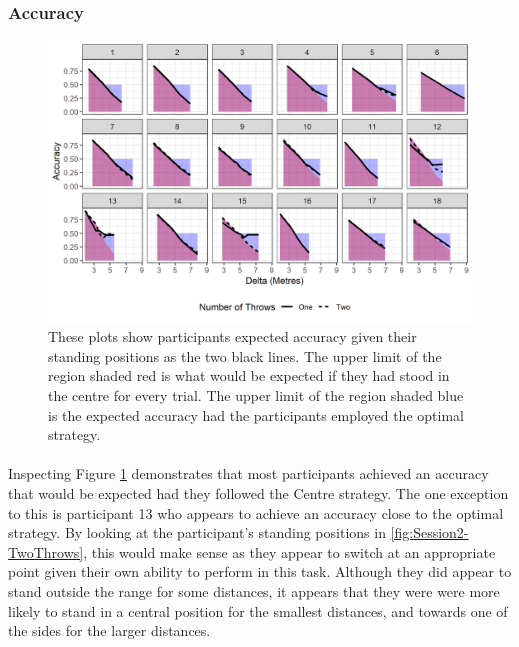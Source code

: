 \documentclass[12pt]{article}
\begin{document}
\subsubsection*{Accuracy}

\begin{figure}[ht!]%
	\includegraphics[scale=0.9]{Figures/Experiment_2_Two_throw/Accuracyshaded_regions}
	\centering
	\captionsetup{justification=centering}
	\caption{These plots show participants expected accuracy given their standing positions as the two black lines. The upper limit of the region shaded red is what would be expected if they had stood in the centre for every trial. The upper limit of the region shaded blue is the expected accuracy had the participants employed the optimal strategy.}
	\label{fig:Session2-TwoThrows-Accuracy}
\end{figure}

\paragraph{} Inspecting Figure \ref{fig:Session2-TwoThrows-Accuracy} demonstrates that most participants achieved an accuracy that would be expected had they followed the Centre strategy. The one exception to this is participant 13 who appears to achieve an accuracy close to the optimal strategy. By looking at the participant's standing positions in \ref{fig:Session2-TwoThrows}, this would make sense as they appear to switch at an appropriate point given their own ability to perform in this task. Although they did appear to stand outside the range for some distances, it appears that they were were more likely to stand in a central position for the smallest distances, and towards one of the sides for the larger distances. 
\end{document}
